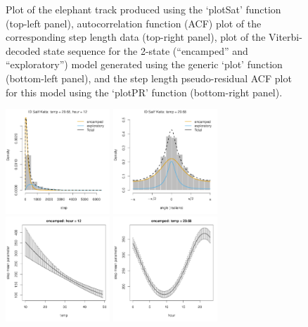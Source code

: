 \documentclass[12pt]{article}\usepackage[]{graphicx}\usepackage[]{xcolor}
\begin{document}
\begin{figure}[htbp]
  \caption{Plot of the elephant track produced using the `plotSat' function (top-left panel), autocorrelation function (ACF) plot of the corresponding step length data (top-right panel), plot of the Viterbi-decoded state sequence for the 2-state (``encamped'' and ``exploratory'') model generated using the generic `plot' function (bottom-left panel), and the step length pseudo-residual ACF plot for this model using the `plotPR' function (bottom-right panel).}
  \label{fig:elephantResults1}
\end{figure}

\begin{figure}[htbp]
  \centering
  \includegraphics[width=0.35\textwidth]{plot_elephantResults009.pdf}
  \includegraphics[width=0.35\textwidth]{plot_elephantResults012.pdf} \\
  \includegraphics[width=0.35\textwidth]{plot_elephantResults001.pdf} 
  \includegraphics[width=0.35\textwidth]{plot_elephantResults002.pdf} \\

\end{figure}
\end{document}
